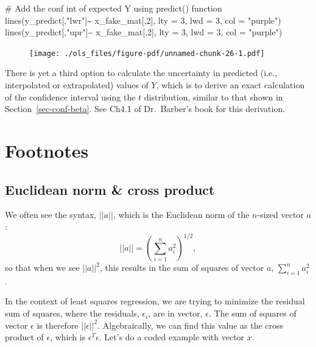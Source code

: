 \documentclass[
  letterpaper,
  DIV=11,
  numbers=noendperiod]{scrreprt}
\newenvironment{Shaded}{\begin{snugshade}}{\end{snugshade}}
\newcommand{\AttributeTok}[1]{\textcolor[rgb]{0.40,0.45,0.13}{#1}}
\newcommand{\CommentTok}[1]{\textcolor[rgb]{0.37,0.37,0.37}{#1}}
\newcommand{\DecValTok}[1]{\textcolor[rgb]{0.68,0.00,0.00}{#1}}
\newcommand{\FunctionTok}[1]{\textcolor[rgb]{0.28,0.35,0.67}{#1}}
\newcommand{\NormalTok}[1]{\textcolor[rgb]{0.00,0.23,0.31}{#1}}
\newcommand{\SpecialCharTok}[1]{\textcolor[rgb]{0.37,0.37,0.37}{#1}}
\newcommand{\StringTok}[1]{\textcolor[rgb]{0.13,0.47,0.30}{#1}}
\begin{document}
\begin{Shaded}
\begin{Highlighting}[]
\CommentTok{\# Add the conf int of expected Y using predict() function}
\FunctionTok{lines}\NormalTok{(y\_predict[,}\StringTok{"lwr"}\NormalTok{]}\SpecialCharTok{\textasciitilde{}}\NormalTok{ x\_fake\_mat[,}\DecValTok{2}\NormalTok{], }\AttributeTok{lty =} \DecValTok{3}\NormalTok{, }\AttributeTok{lwd =} \DecValTok{3}\NormalTok{, }\AttributeTok{col =} \StringTok{"purple"}\NormalTok{)}
\FunctionTok{lines}\NormalTok{(y\_predict[,}\StringTok{"upr"}\NormalTok{]}\SpecialCharTok{\textasciitilde{}}\NormalTok{ x\_fake\_mat[,}\DecValTok{2}\NormalTok{], }\AttributeTok{lty =} \DecValTok{3}\NormalTok{, }\AttributeTok{lwd =} \DecValTok{3}\NormalTok{, }\AttributeTok{col =} \StringTok{"purple"}\NormalTok{)}
\end{Highlighting}
\end{Shaded}

\begin{figure}[H]

{\centering \texttt{[image: ./ols\_files/figure-pdf/unnamed-chunk-26-1.pdf]}

}

\end{figure}

There is yet a third option to calculate the uncertainty in predicted
(i.e., interpolated or extrapolated) values of \(Y\), which is to derive
an exact calculation of the confidence interval using the \(t\)
distribution, similar to that shown in Section~\ref{sec-conf-beta}. See
Ch4.1 of Dr.~Barber's book for this derivation.

\hypertarget{footnotes-2}{%
\section{Footnotes}\label{footnotes-2}}

\hypertarget{sec-crossprod}{%
\subsection{Euclidean norm \& cross product}\label{sec-crossprod}}

We often see the syntax, \(|| a ||\), which is the Euclidean norm of the
\(n\)-sized vector \(a\):
\[|| a || = \left( \sum_{i=1}^{n} a_i^2 \right) ^ {1/2} ,\] so that when
we see \(|| a ||^2\), this results in the sum of squares of vector
\(a\), \(\sum_{i=1}^{n} a_i^2\).

In the context of least squares regression, we are trying to minimize
the residual sum of squares, where the residuals, \(\epsilon_i\), are in
vector, \(\epsilon\). The sum of squares of vector \(\epsilon\) is
therefore \(|| \epsilon ||^2\). Algebraically, we can find this value as
the cross product of \(\epsilon\), which is \(\epsilon^{T}\epsilon\).
Let's do a coded example with vector \(x\).
\end{document}
